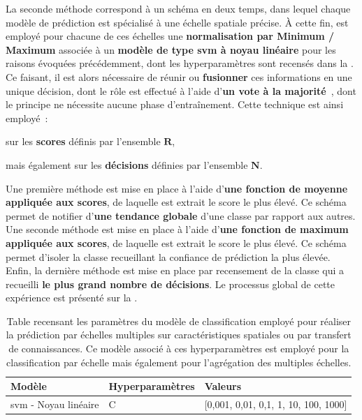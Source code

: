 La seconde méthode correspond à un schéma en deux temps, dans lequel chaque modèle de prédiction est spécialisé à une échelle spatiale précise. À cette fin, est employé pour chacune de ces échelles une \textbf{normalisation par Minimum / Maximum} associée à un \textbf{modèle de type \gls{svm} à noyau linéaire} pour les raisons évoquées précédemment, dont les hyperparamètres sont recensés dans la . Ce faisant, il est alors nécessaire de réunir ou \textbf{fusionner} ces informations en une unique décision, dont le rôle est effectué à l'aide d'\textbf{un vote à la majorité}~\cite{Kam1994,Lam1997}, dont le principe ne nécessite aucune phase d'entraînement. Cette technique est ainsi employé~: 
\begin{inlinerate}
    \item sur les \textbf{scores} définis par l'ensemble $\mathbf{R}$,
    \item mais également sur les \textbf{décisions} définies par l'ensemble $\mathbf{N}$.
\end{inlinerate} Une première méthode est mise en place à l'aide d'\textbf{une fonction de moyenne appliquée aux scores}, de laquelle est extrait le score le plus élevé. Ce schéma permet de notifier d'\textbf{une tendance globale} d'une classe par rapport aux autres. Une seconde méthode est mise en place à l'aide d'\textbf{une fonction de maximum appliquée aux scores}, de laquelle est extrait le score le plus élevé. Ce schéma permet d'isoler la classe recueillant la confiance de prédiction la plus élevée. Enfin, la dernière méthode est mise en place par recensement de la classe qui a recueilli \textbf{le plus grand nombre de décisions}. Le processus global de cette expérience est présenté sur la .\par

\begin{table}[H]
    \centering
    \begin{tabular}{lll}
        \toprule
        \textbf{Modèle}                                 & \textbf{Hyperparamètres}  & \textbf{Valeurs}                          \\ \midrule
        \gls{svm} - Noyau linéaire                      & C                         & [0,001, 0,01, 0,1, 1, 10, 100, 1000]      \\ 
        \bottomrule 
    \end{tabular} 
    \caption{Table recensant les paramètres du modèle de classification employé pour réaliser la prédiction par échelles multiples sur caractéristiques spatiales ou par transfert de connaissances. Ce modèle associé à ces hyperparamètres est employé pour la classification par échelle mais également pour l'agrégation des multiples échelles.}
    \label{tab:parameters_image_improvement_models_multiscale_spatial}
\end{table}\par


